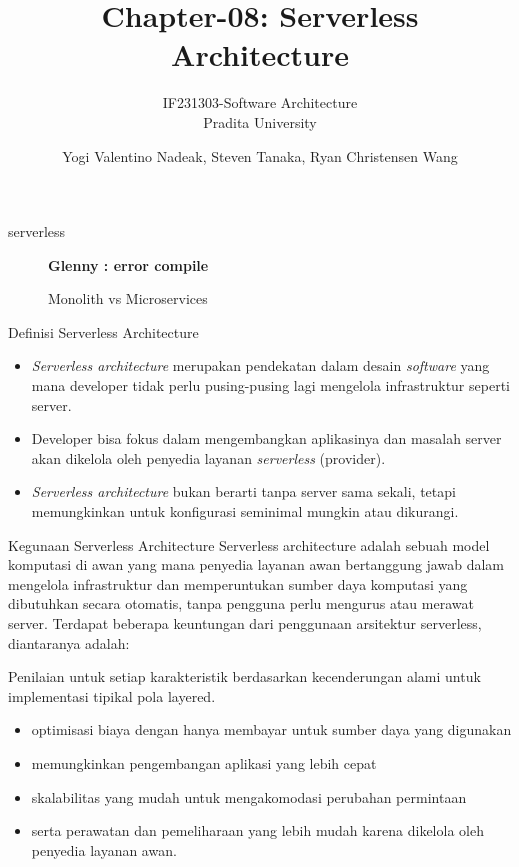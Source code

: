 \documentclass{beamer}
\title{Chapter-08: Serverless Architecture}
\subtitle{IF231303-Software Architecture\\Pradita University}
\author{Yogi Valentino Nadeak, Steven Tanaka, Ryan Christensen Wang}
\begin{document}
	\begin{frame}{serverless}
		\begin{figure}[h]
			\centering
		\textbf{Glenny : error compile}
			\caption{Monolith vs Microservices}
			\label{fig:serverless}
		\end{figure}
	\end{frame}

    \begin{frame}[plain]
		\maketitle
	\end{frame}
	

    \begin{frame}{Definisi Serverless Architecture}
        \begin{itemize}
            \item \emph{Serverless architecture} merupakan pendekatan dalam desain \emph{software} yang mana developer tidak perlu pusing-pusing lagi mengelola infrastruktur seperti server.
            \item Developer bisa fokus dalam mengembangkan aplikasinya dan masalah server akan dikelola oleh penyedia layanan \emph{serverless} (provider).
            \item \emph{Serverless architecture} bukan berarti tanpa server sama sekali, tetapi memungkinkan untuk konfigurasi seminimal mungkin atau dikurangi.
        \end{itemize}
    \end{frame}


    \begin{frame}{Kegunaan Serverless Architecture}
        Serverless architecture adalah sebuah model komputasi di awan yang mana penyedia layanan awan bertanggung jawab dalam mengelola infrastruktur dan memperuntukan sumber daya komputasi yang dibutuhkan secara otomatis, tanpa pengguna perlu mengurus atau merawat server. Terdapat beberapa keuntungan dari penggunaan arsitektur serverless, diantaranya adalah:

        Penilaian untuk setiap karakteristik berdasarkan kecenderungan alami untuk implementasi tipikal pola layered.

        \begin{itemize}
            \item optimisasi biaya dengan hanya membayar untuk sumber daya yang digunakan
	        \item memungkinkan pengembangan aplikasi yang lebih cepat
	        \item skalabilitas yang mudah untuk mengakomodasi perubahan permintaan
	        \item serta perawatan dan pemeliharaan yang lebih mudah karena dikelola oleh penyedia layanan awan.
        \end{itemize}
    \end{frame}
\end{document}
